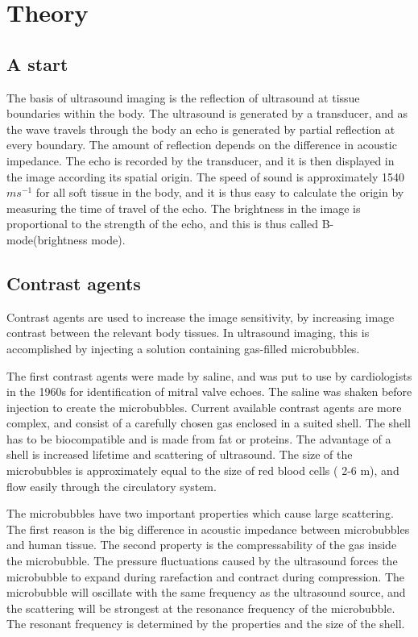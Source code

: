 \section{Theory}
\subsection{A start}
The basis of ultrasound imaging is the reflection of ultrasound at tissue boundaries within the body. The ultrasound is generated by a transducer, and as the wave travels through the body an echo is generated by partial reflection at every boundary. The amount of reflection depends on the difference in acoustic impedance. The echo is recorded by the transducer, and it is then displayed in the image according its spatial origin. The speed of sound is approximately 1540 $m s^{-1}$ for all soft tissue in the body, and it is thus easy to calculate the origin by measuring the time of travel of the echo.  The brightness in the image is proportional to the strength of the echo, and this is thus called B-mode(brightness mode). 



\subsection{Contrast agents}
Contrast agents are used to increase the image sensitivity, by increasing image contrast between the relevant body tissues. In ultrasound imaging, this is accomplished by injecting a solution containing gas-filled microbubbles. 

The first contrast agents were made by saline, and was put to use by cardiologists in the 1960s for identification of mitral valve echoes. The saline was shaken before injection to create the microbubbles. Current available contrast agents are more complex, and consist of a carefully chosen gas enclosed in a suited shell. The shell has to be biocompatible and is made from fat or proteins. The advantage of a shell is increased lifetime and scattering of ultrasound. The size of the microbubbles is approximately equal to the size of red blood cells ( 2-6 \mu m), and flow easily through the circulatory system. 

The microbubbles have two important properties which cause large scattering. The first reason is the big difference in acoustic impedance between microbubbles and human tissue. The second property is the compressability of the gas inside the microbubble. The pressure fluctuations caused by the ultrasound forces the microbubble to expand during rarefaction and contract during compression. The microbubble will oscillate with the same frequency as the ultrasound source, and the scattering will be strongest at the resonance frequency of the microbubble. The resonant frequency is determined by the properties and the size of the shell. 

